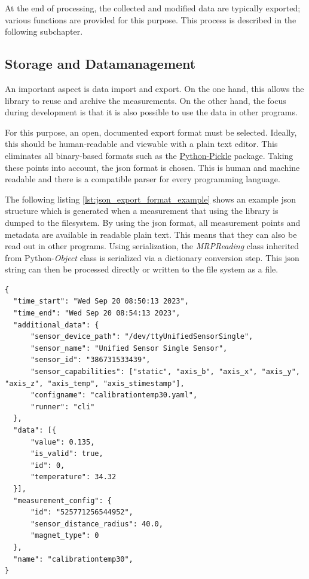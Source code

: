 At the end of processing, the collected and modified data are typically
exported; various functions are provided for this purpose. This process
is described in the following subchapter.

\hypertarget{storage-and-datamanagement}{%
\subsection{Storage and
Datamanagement}\label{storage-and-datamanagement}}

An important aspect is data import and export. On the one hand, this
allows the library to reuse and archive the measurements. On the other
hand, the focus during development is that it is also possible to use
the data in other programs.

\newpage

For this purpose, an open, documented export format must be selected.
Ideally, this should be human-readable and viewable with a plain text
editor. This eliminates all binary-based formats such as the
\href{https://docs.python.org/3/library/pickle.html}{Python-Pickle}
package. Taking these points into account, the \gls{json} format is
chosen. This is human and machine readable and there is a compatible
parser for every programming language.

The following listing \ref{lst:json_export_format_example} shows an
example \gls{json} structure which is generated when a measurement that
using the library is dumped to the filesystem. By using the \gls{json}
format, all measurement points and metadata are available in readable
plain text. This means that they can also be read out in other programs.
Using serialization, the \emph{MRPReading} class inherited from
Python-\emph{Object} class is serialized via a dictionary conversion
step. This \gls{json} string can then be processed directly or written
to the file system as a file.

\begin{lstlisting}[caption={JSON structure of an exported MRPReading based measurement with information about the measurement environment, additional meta-data and raw data value objects}, label=lst:json_export_format_example]
{
  "time_start": "Wed Sep 20 08:50:13 2023",
  "time_end": "Wed Sep 20 08:54:13 2023",
  "additional_data": {
      "sensor_device_path": "/dev/ttyUnifiedSensorSingle",
      "sensor_name": "Unified Sensor Single Sensor",
      "sensor_id": "386731533439",
      "sensor_capabilities": ["static", "axis_b", "axis_x", "axis_y", "axis_z", "axis_temp", "axis_stimestamp"],
      "configname": "calibrationtemp30.yaml",
      "runner": "cli"
  },
  "data": [{
      "value": 0.135,
      "is_valid": true,
      "id": 0,
      "temperature": 34.32
  }],
  "measurement_config": {
      "id": "525771256544952",
      "sensor_distance_radius": 40.0,
      "magnet_type": 0
  },
  "name": "calibrationtemp30",
}
\end{lstlisting}

